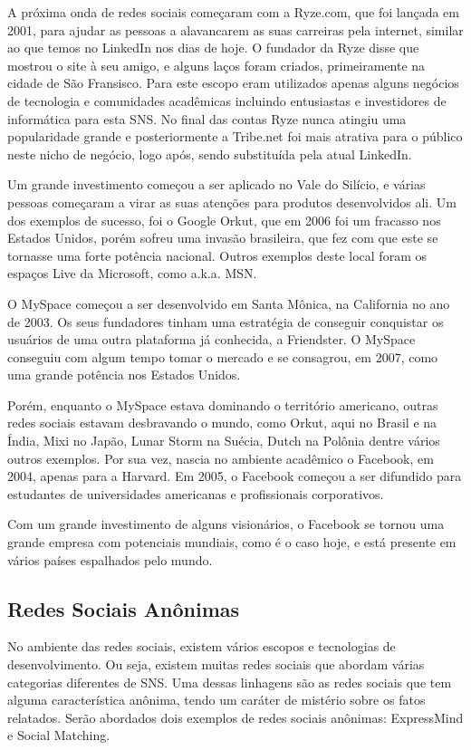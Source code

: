 A próxima onda de redes sociais começaram com a Ryze.com, que foi lançada em 2001,
para ajudar as pessoas a alavancarem as suas carreiras pela internet, similar
ao que temos no LinkedIn nos dias de hoje. O fundador da Ryze disse que mostrou o site à seu amigo,
e alguns laços foram criados, primeiramente na cidade de São Fransisco. Para este
escopo eram utilizados apenas alguns negócios de tecnologia e comunidades acadêmicas
incluindo entusiastas e investidores de informática para esta SNS. No final das
contas Ryze nunca atingiu uma popularidade grande e posteriormente a Tribe.net foi mais atrativa para o
público neste nicho de negócio, logo após, sendo substituída pela atual LinkedIn.

Um grande investimento começou a ser aplicado no Vale do Silício, e várias pessoas
começaram a virar as suas atenções para produtos desenvolvidos ali. Um dos exemplos
de sucesso, foi o Google Orkut, que em 2006 foi  um fracasso nos Estados Unidos, porém
sofreu uma invasão brasileira, que fez com que este se tornasse uma forte potência
nacional. Outros exemplos deste local foram os espaços Live da Microsoft, como a.k.a. MSN.

O MySpace começou a ser desenvolvido em Santa Mônica, na California no ano de 2003.
Os seus fundadores tinham uma estratégia de conseguir conquistar os usuários de uma
outra plataforma já conhecida, a  Friendster. O MySpace conseguiu com algum tempo
tomar o mercado e se consagrou, em 2007, como uma grande potência nos Estados Unidos.

Porém, enquanto o MySpace estava dominando o território americano, outras redes sociais
estavam desbravando o mundo, como Orkut, aqui no Brasil e na Índia, Mixi no Japão, 
Lunar Storm na Suécia, Dutch na Polônia dentre vários outros exemplos. Por sua vez, nascia
no ambiente acadêmico o Facebook, em 2004, apenas para a Harvard. Em 2005, o Facebook começou
a ser difundido para estudantes de universidades americanas e profissionais corporativos.

Com um grande investimento de alguns visionários, o Facebook se tornou uma grande empresa
com potenciais mundiais, como é o caso hoje, e está presente em vários países espalhados
pelo mundo.

\subsection{Redes Sociais Anônimas}
\label{sec:redesociaisanonimas}
No ambiente das redes sociais, existem vários escopos e tecnologias de desenvolvimento.
Ou seja, existem muitas redes sociais que abordam várias categorias diferentes
de SNS. Uma dessas linhagens são as redes sociais que tem alguma característica
anônima, tendo um caráter de mistério sobre os fatos relatados. Serão
abordados dois exemplos de redes sociais anônimas: ExpressMind e Social Matching.

